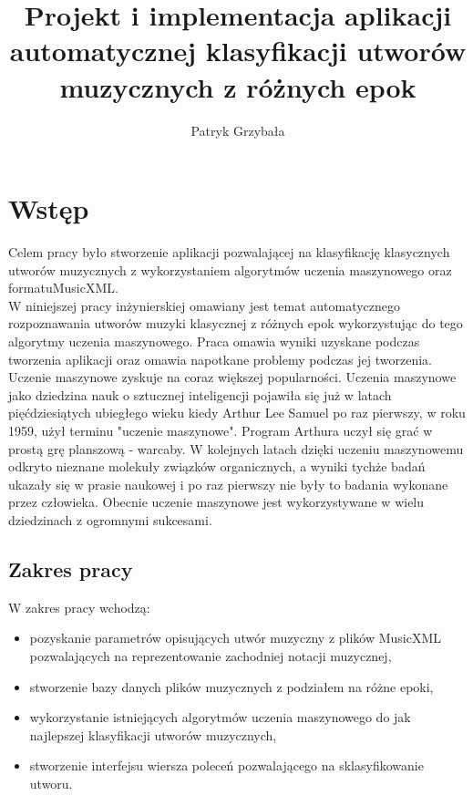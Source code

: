 \documentclass[printmode, eng, openany]{mgr}
\title{Projekt i implementacja aplikacji automatycznej klasyfikacji utworów muzycznych z różnych epok}
\author{Patryk Grzybała}
\newcommand\blankpage{%
    \null
    \thispagestyle{empty}%
    \addtocounter{page}{-1}%
    \newpage}
\newcommand\tab[1][1cm]{\hspace*{#1}}
\begin{document}
\maketitle
\blankpage
\tableofcontents
{
\listoffigures

\listoftables
}
\chapter{Wstęp}
\tab Celem pracy było stworzenie aplikacji pozwalającej na klasyfikację klasycznych utworów muzycznych z wykorzystaniem algorytmów uczenia maszynowego oraz formatu\linebreak MusicXML.\\
\tab W niniejszej pracy inżynierskiej omawiany jest temat automatycznego rozpoznawania utworów muzyki klasycznej z różnych epok wykorzystując do tego algorytmy uczenia maszynowego. Praca omawia wyniki uzyskane podczas tworzenia aplikacji oraz omawia napotkane problemy podczas jej tworzenia. \\

\tab Uczenie maszynowe zyskuje na coraz większej popularności. Uczenia maszynowe jako dziedzina nauk o sztucznej inteligencji pojawiła się już w latach pięćdziesiątych ubiegłego wieku kiedy Arthur Lee Samuel po raz pierwszy, w roku 1959, użył terminu "uczenie maszynowe". Program Arthura uczył się grać w prostą grę planszową - warcaby. \cite{mlearn}\linebreak W kolejnych latach dzięki uczeniu maszynowemu odkryto nieznane molekuły związków organicznych, a wyniki tychże badań ukazały się w prasie naukowej i po raz pierwszy nie były to badania wykonane przez człowieka. Obecnie uczenie maszynowe jest wykorzystywane w wielu dziedzinach z ogromnymi sukcesami.
\section{Zakres pracy}
\tab W zakres pracy wchodzą:
\begin{itemize}
\item pozyskanie parametrów opisujących utwór muzyczny z plików MusicXML \cite{mxml} pozwalających na reprezentowanie zachodniej notacji muzycznej,
\item stworzenie bazy danych plików muzycznych z podziałem na różne epoki,
\item wykorzystanie istniejących algorytmów uczenia maszynowego do jak najlepszej klasyfikacji utworów muzycznych,
\item stworzenie interfejsu wiersza poleceń pozwalającego na sklasyfikowanie utworu.
\end{itemize}
\end{document}
